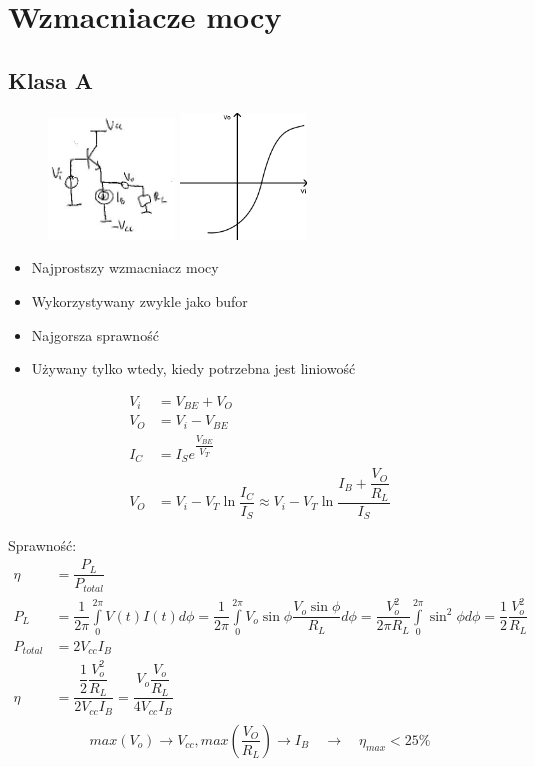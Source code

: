 \documentclass[10pt,a4paper]{article}
\begin{document}
\section{Wzmacniacze mocy}
\subsection{Klasa A}
\begin{figure}[H]
\centering
\includegraphics[width=0.3\textwidth]{wzm_moc_a.png}
\includegraphics[width=0.3\textwidth]{wzm_moc_a_wyk.png}
\end{figure}
\begin{itemize}
\item{Najprostszy wzmacniacz mocy}
\item{Wykorzystywany zwykle jako bufor}
\item{Najgorsza sprawność}
\item{Używany tylko wtedy, kiedy potrzebna jest liniowość}
\end{itemize}
\begin{align*}
V_i &= V_{BE}+V_O \\
V_O&=V_i-V_{BE} \\
I_C&=I_S e^{\dfrac{V_{BE}}{V_T}} \\
V_O &= V_i -V_T \ln \dfrac{I_C}{I_S} \approx V_i - V_T \ln \dfrac{I_B + \dfrac{V_O}{R_L}}{I_S}
\end{align*}

Sprawność:
\begin{align*}
\eta &= \dfrac{P_L}{P_{total}}\\
P_L &= \dfrac{1}{2\pi} \int \limits^{2 \pi}_{0} V(t)I(t)d\phi = \dfrac{1}{2 \pi} \int \limits^{2 \pi}_{0} V_o \sin \phi \dfrac{V_o \sin \phi}{R_L} d\phi = \dfrac{V_o^2}{2 \pi R_L} \int \limits^{2 \pi}_{0} \sin^2 \phi d\phi = \dfrac{1}{2}\dfrac{V_o^2}{R_L} \\
P_{total} &= 2 V_{cc} I_B \\
\eta &= \dfrac{\dfrac{1}{2} \dfrac{V_o^2}{R_L}}{2 V_{cc} I_B} = \dfrac{V_o \dfrac{V_o}{R_L}}{4 V_{cc} I_B} \\
\end{align*}
\begin{equation}
max(V_o)\rightarrow V_{cc}, max(\dfrac{V_O}{R_L})\rightarrow I_B \quad \rightarrow \quad \eta_{max} < 25\% \nonumber
\end{equation}
\end{document}
